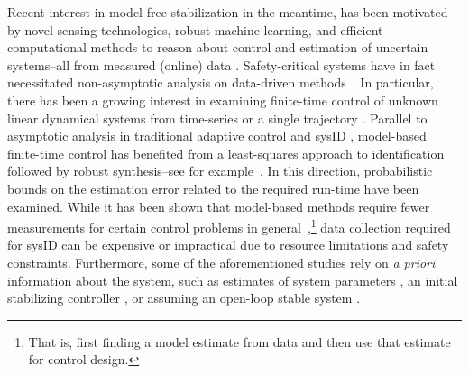 \documentclass[journal]{IEEEtran}
\theoremstyle{definition}
\theoremstyle{remark}
\begin{document}
	Recent interest in model-free stabilization in the meantime, has been motivated by novel sensing technologies, robust machine learning, and efficient computational methods to reason about control and estimation of uncertain systems--all from measured (online) data \cite{hou2017data,sedghi2020multi}.
	Safety-critical systems have in fact necessitated non-asymptotic analysis on data-driven methods~\cite{faradonbeh2018finite, dean2019safely}.
	In particular, there has been a growing interest in examining
	finite-time control of unknown linear dynamical systems from time-series or a single trajectory \cite{alaeddini2018linear, sarkar2019finite, berberich2019robust, oymak2019non, fattahi2019learning, wagenmaker2020active, tsiamis2019finite}.
	Parallel to asymptotic analysis in traditional adaptive control and \ac{sysID} \cite{ljung2001system, narendra2012stable, aastrom2013adaptive}, model-based finite-time control has benefited from a least-squares approach to identification followed by robust synthesis--see for example~\cite{dean2017sample}.
	In this direction, probabilistic bounds on the estimation error related to the required run-time have been examined.
	While it has been shown that model-based methods require fewer measurements for certain control problems in general~\cite{tu2018gap},\footnote{That is, first finding a model estimate from data and then use that estimate for control design.} data collection required for \ac{sysID} can be expensive or impractical due to resource limitations and safety constraints.
	Furthermore, some of the aforementioned studies rely on \textit{a priori} information about the system, such as estimates of system parameters \cite{dean2019safely}, an initial stabilizing controller \cite{kim2005stable, bradtke1994adaptive, fazel2018global, alemzadeh2019distributed}, or assuming an open-loop stable system \cite{oymak2019non, sarkar2019finite}.
	
\end{document}
